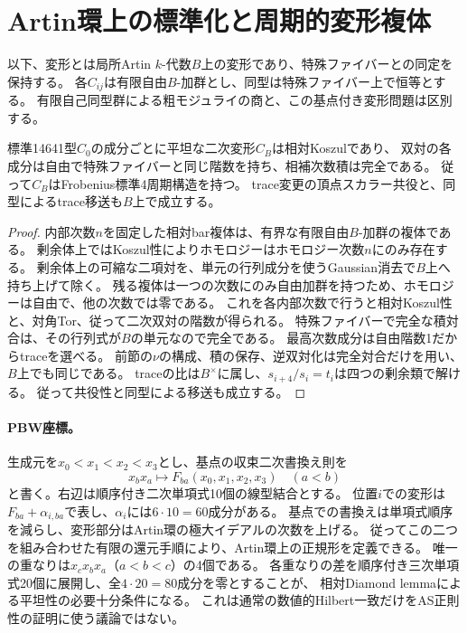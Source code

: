 \section{Artin環上の標準化と周期的変形複体}\label{sec:deformation-complex}
以下、変形とは局所Artin $k$-代数$B$上の変形であり、特殊ファイバーとの同定を保持する。
各$C_{ij}$は有限自由$B$-加群とし、同型は特殊ファイバー上で恒等とする。
有限自己同型群による粗モジュライの商と、この基点付き変形問題は区別する。

\begin{lemma}\label{lem:relative-four}
標準14641型$C_0$の成分ごとに平坦な二次変形$C_B$は相対Koszulであり、
双対の各成分は自由で特殊ファイバーと同じ階数を持ち、相補次数積は完全である。
従って$C_B$はFrobenius標準4周期構造を持つ。
trace変更の頂点スカラー共役と、同型によるtrace移送も$B$上で成立する。
\end{lemma}
\begin{proof}
内部次数$n$を固定した相対bar複体は、有界な有限自由$B$-加群の複体である。
剰余体上ではKoszul性によりホモロジーはホモロジー次数$n$にのみ存在する。
剰余体上の可縮な二項対を、単元の行列成分を使うGaussian消去で$B$上へ持ち上げて除く。
残る複体は一つの次数にのみ自由加群を持つため、ホモロジーは自由で、他の次数では零である。
これを各内部次数で行うと相対Koszul性と、対角Tor、従って二次双対の階数が得られる。
特殊ファイバーで完全な積対合は、その行列式が$B$の単元なので完全である。
最高次数成分は自由階数1だからtraceを選べる。
前節の$\nu$の構成、積の保存、逆双対化は完全対合だけを用い、$B$上でも同じである。
traceの比は$B^\times$に属し、$s_{i+4}/s_i=t_i$は四つの剰余類で解ける。
従って共役性と同型による移送も成立する。
\end{proof}

\paragraph{PBW座標。}
生成元を$x_0<x_1<x_2<x_3$とし、基点の収束二次書換え則を
\[
 x_bx_a\longmapsto F_{ba}(x_0,x_1,x_2,x_3)\quad(a<b)
\]
と書く。右辺は順序付き二次単項式10個の線型結合とする。
位置$i$での変形は$F_{ba}+\alpha_{i,ba}$で表し、$\alpha_i$には$6\cdot10=60$成分がある。
基点での書換えは単項式順序を減らし、変形部分はArtin環の極大イデアルの次数を上げる。
従ってこの二つを組み合わせた有限の還元手順により、Artin環上の正規形を定義できる。
唯一の重なりは$x_cx_bx_a$（$a<b<c$）の4個である。
各重なりの差を順序付き三次単項式20個に展開し、全$4\cdot20=80$成分を零とすることが、
相対Diamond lemmaによる平坦性の必要十分条件になる。
これは通常の数値的Hilbert一致だけをAS正則性の証明に使う議論ではない。

